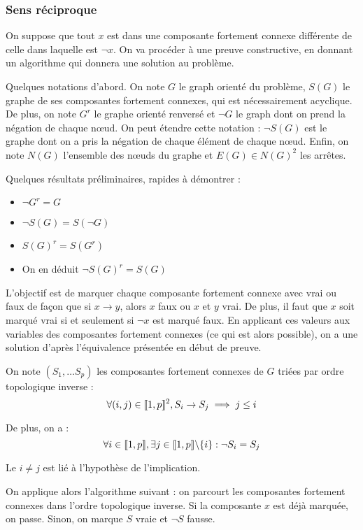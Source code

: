 \subsubsection{Sens réciproque}
On suppose que tout $x$ est dans une composante fortement connexe différente de
celle dans laquelle est $\neg x$. On va procéder à une preuve constructive, en
donnant un algorithme qui donnera une solution au problème.

Quelques notations d'abord. On note $G$ le graph orienté du problème, $S(G)$ le
graphe de ses composantes fortement connexes, qui est nécessairement acyclique.
De plus, on note $G^r$ le graphe orienté renversé et $\neg G$ le graph dont on
prend la négation de chaque nœud. On peut étendre cette notation : $\neg S(G)$
est le graphe dont on a pris la négation de chaque élément de chaque nœud.
Enfin, on note $N(G)$ l'ensemble des nœuds du graphe et $E(G) \in N(G)^2$ les
arrêtes.

Quelques résultats préliminaires, rapides à démontrer :
\begin{itemize}
 \item $\neg G^r = G$
 \item $\neg S(G) = S(\neg G)$
 \item $S(G)^r = S(G^r)$
 \item On en déduit $\neg S(G)^r = S(G)$
\end{itemize}

L'objectif est de marquer chaque composante fortement connexe avec vrai ou faux
de façon que si $x \rightarrow y$, alors $x$ faux ou $x$ et $y$ vrai. De plus,
il faut que $x$ soit marqué vrai si et seulement si $\neg x$ est marqué faux.
En applicant ces valeurs aux variables des composantes fortement connexes
(ce qui est alors possible), on a une solution d'après l'équivalence présentée
en début de preuve.

On note $(S_1,\ldots S_p)$ les composantes fortement connexes de $G$ triées par
ordre topologique inverse :
    \[ \forall (i,j)\in\llbracket 1, p \rrbracket^2, S_i \rightarrow S_j \implies j \leq i \]

De plus, on a :
    \[ \forall i\in\llbracket 1, p \rrbracket, \exists j\in\llbracket 1, p \rrbracket\backslash\{i\}: \neg S_i = S_j \]

Le $i\neq j$ est lié à l'hypothèse de l'implication.

On applique alors l'algorithme suivant : on parcourt les composantes fortement
connexes dans l'ordre topologique inverse. Si la composante $x$ est déjà
marquée, on passe. Sinon, on marque $S$ vraie et $\neg S$ fausse.


